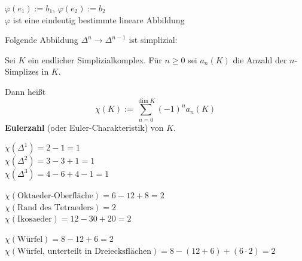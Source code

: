 \begin{beispiel}
    \begin{bspenum}
        \item $\varphi(e_1) := b_1$, $\varphi(e_2) := b_2$\\
              $\varphi$ ist eine eindeutig bestimmte lineare Abbildung

              

        \item Folgende Abbildung $\Delta^n \rightarrow \Delta^{n-1}$ 
              ist simplizial:

              
        \item {}

            \resizebox{0.9\linewidth}{!}{}
    \end{bspenum}
\end{beispiel}

\begin{definition}%
    Sei $K$ ein endlicher Simplizialkomplex. Für $n \geq 0$ sei
    $a_n(K)$ die Anzahl der $n$-Simplizes in $K$.

    Dann heißt 
    \[\chi(K) := \sum_{n=0}^{\dim K} (-1)^n a_n(K)\]
    \textbf{Eulerzahl} (oder Euler-Charakteristik)
    von $K$.
\end{definition}

\begin{beispiel}
    \begin{bspenum}
        \item $\chi(\Delta^1) = 2 - 1 = 1$\\
              $\chi(\Delta^2) = 3 - 3 + 1 = 1$\\
              $\chi(\Delta^3) = 4 - 6 + 4 - 1 = 1$
        \item $\chi(\text{Oktaeder-Oberfläche}) = 6 - 12 + 8 = 2$\\
              $\chi(\text{Rand des Tetraeders}) = 2$\\
              $\chi(\text{Ikosaeder}) = 12 - 30 + 20 = 2$
        \item $\chi(\text{Würfel}) = 8 - 12 + 6 = 2$\\
              $\chi(\text{Würfel, unterteilt in Dreiecksflächen}) = 8 - (12 + 6) + (6 \cdot 2) = 2$
    \end{bspenum}
\end{beispiel}


